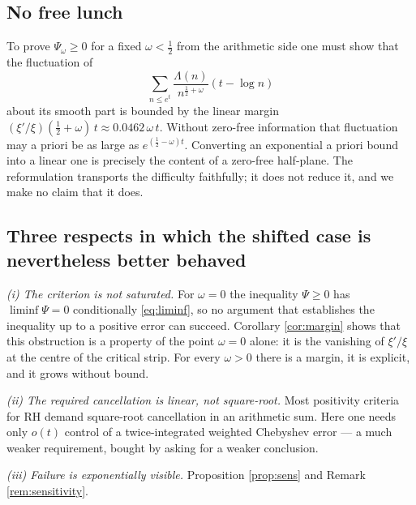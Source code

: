 \documentclass[11pt,reqno]{amsart}
\theoremstyle{plain}
\theoremstyle{definition}
\begin{document}
\subsection{No free lunch}
To prove $\Psi_\omega\ge0$ for a fixed $\omega<\tfrac12$ from the arithmetic side one must show
that the fluctuation of
\[
  \sum_{n\le e^{t}}\frac{\Lambda(n)}{n^{\frac12+\omega}}(t-\log n)
\]
about its smooth part is bounded by the linear margin $(\xi'/\xi)(\tfrac12+\omega)\,t
\approx0.0462\,\omega\,t$. Without zero-free information that fluctuation may a priori be as large
as $e^{(\frac12-\omega)t}$. Converting an exponential a priori bound into a linear one is precisely
the content of a zero-free half-plane. The reformulation transports the difficulty faithfully; it
does not reduce it, and we make no claim that it does.

\subsection{Three respects in which the shifted case is nevertheless better behaved}

\emph{(i) The criterion is not saturated.} For $\omega=0$ the inequality $\Psi\ge0$ has
$\liminf\Psi=0$ conditionally \eqref{eq:liminf}, so no argument that establishes the inequality up to
a positive error can succeed. Corollary \ref{cor:margin} shows that this obstruction is a property
of the point $\omega=0$ alone: it is the vanishing of $\xi'/\xi$ at the centre of the critical
strip. For every $\omega>0$ there is a margin, it is explicit, and it grows without bound.

\emph{(ii) The required cancellation is linear, not square-root.} Most positivity criteria for RH
demand square-root cancellation in an arithmetic sum. Here one needs only $o(t)$ control of a
twice-integrated weighted Chebyshev error --- a much weaker requirement, bought by asking for a
weaker conclusion.

\emph{(iii) Failure is exponentially visible.} Proposition \ref{prop:sens} and Remark
\ref{rem:sensitivity}.
\end{document}

